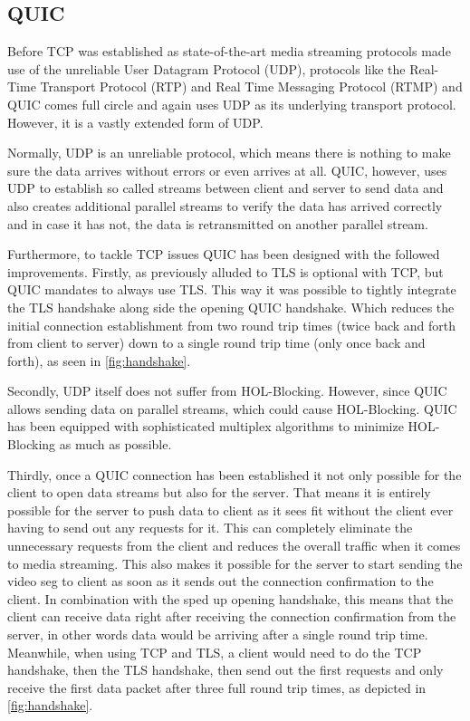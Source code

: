 \documentclass[conference]{IEEEtran}
\begin{document}
\subsection{QUIC}
Before TCP was established as state-of-the-art media streaming protocols made use of the unreliable User Datagram Protocol (UDP), protocols like the Real-Time Transport Protocol (RTP) \cite{b9} and Real Time Messaging Protocol (RTMP) \cite{b10} and QUIC comes full circle and again uses UDP as its underlying transport protocol. However, it is a vastly extended form of UDP.

Normally, UDP is an unreliable protocol, which means there is nothing to make sure the data arrives without errors or even arrives at all. QUIC, however, uses UDP to establish so called streams between client and server to send data and also creates additional parallel streams to verify the data has arrived correctly and in case it has not, the data is retransmitted on another parallel stream.

Furthermore, to tackle TCP issues QUIC has been designed with the followed improvements. Firstly, as previously alluded to TLS is optional with TCP, but QUIC mandates to always use TLS. This way it was possible to tightly integrate the TLS handshake along side the opening QUIC handshake. Which reduces the initial connection establishment from two round trip times (twice back and forth from client to server) down to a single round trip time (only once back and forth), as seen in \cref{fig:handshake}.

Secondly, UDP itself does not suffer from HOL-Blocking. However, since QUIC allows sending data on parallel streams, which could cause HOL-Blocking. QUIC has been equipped with sophisticated multiplex algorithms to minimize HOL-Blocking as much as possible.

Thirdly, once a QUIC connection has been established it not only possible for the client to open data streams but also for the server. That means it is entirely possible for the server to push data to client as it sees fit without the client ever having to send out any requests for it. This can completely eliminate the unnecessary requests from the client and reduces the overall traffic when it comes to media streaming. This also makes it possible for the server to start sending the video seg to client as soon as it sends out the connection confirmation to the client. In combination with the sped up opening handshake, this means that the client can receive data right after receiving the connection confirmation from the server, in other words data would be arriving after a single round trip time. Meanwhile, when using TCP and TLS, a client would need to do the TCP handshake, then the TLS handshake, then send  out the first requests and only receive the first data packet after three full round trip times, as depicted in \cref{fig:handshake}.
\end{document}

